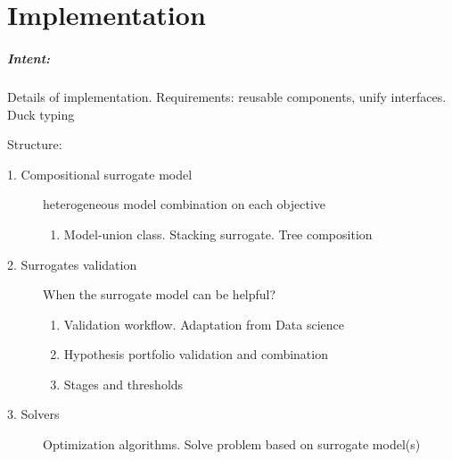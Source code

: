 \chapter{Implementation}

\begin{blockquote}
    \paragraph{Intent:} Details of implementation. Requirements: reusable components, unify interfaces. Duck typing 
    
    Structure:
    \begin{description}

        \item[1. Compositional surrogate model] heterogeneous model combination on each objective
        \begin{enumerate}
            \item Model-union class. Stacking surrogate. Tree composition
        \end{enumerate}

        \item[2. Surrogates validation] When the surrogate model can be helpful?
        \begin{enumerate}
            \item Validation workflow. Adaptation from Data science
            \item Hypothesis portfolio validation and combination
            \item Stages and thresholds
        \end{enumerate}

        \item[3. Solvers] Optimization algorithms. Solve problem based on surrogate model(s)
    \end{description}
\end{blockquote}

